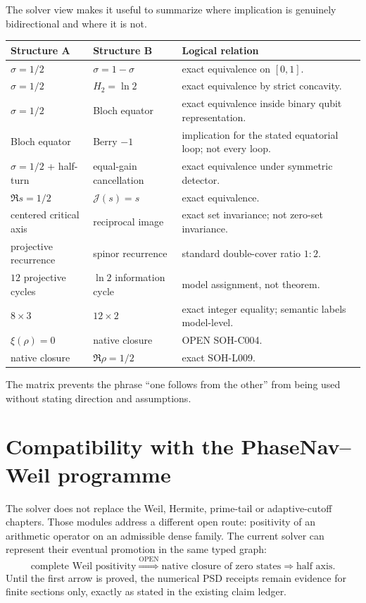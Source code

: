 The solver view makes it useful to summarize where implication is genuinely
bidirectional and where it is not.
\begin{longtable}{@{}p{}p{}p{}@{}}
\toprule
Structure A & Structure B & Logical relation\\
\midrule
$\sigma=1/2$ & $\sigma=1-\sigma$ & exact equivalence on $[0,1]$.\\
$\sigma=1/2$ & $H_2=\ln2$ & exact equivalence by strict concavity.\\
$\sigma=1/2$ & Bloch equator & exact equivalence inside binary qubit representation.\\
Bloch equator & Berry $-1$ & implication for the stated equatorial loop; not every loop.\\
$\sigma=1/2$ + half-turn & equal-gain cancellation & exact equivalence under symmetric detector.\\
$\Re s=1/2$ & $\mathcal J(s)=s$ & exact equivalence.\\
centered critical axis & reciprocal image & exact set invariance; not zero-set invariance.\\
projective recurrence & spinor recurrence & standard double-cover ratio $1:2$.\\
$12$ projective cycles & $\ln2$ information cycle & model assignment, not theorem.\\
$8\times3$ & $12\times2$ & exact integer equality; semantic labels model-level.\\
$\xi(\rho)=0$ & native closure & OPEN SOH-C004.\\
native closure & $\Re\rho=1/2$ & exact SOH-L009.\\
\bottomrule
\end{longtable}

The matrix prevents the phrase ``one follows from the other'' from being used
without stating direction and assumptions.

\section{Compatibility with the PhaseNav--Weil programme}

The solver does not replace the Weil, Hermite, prime-tail or adaptive-cutoff
chapters.  Those modules address a different open route: positivity of an
arithmetic operator on an admissible dense family.  The current solver can
represent their eventual promotion in the same typed graph:
\begin{equation}
 \text{complete Weil positivity}
 \stackrel{\mathrm{OPEN}}{\Longrightarrow}
 \text{native closure of zero states}
 \Longrightarrow
 \text{half axis}.
\end{equation}
Until the first arrow is proved, the numerical PSD receipts remain evidence for
finite sections only, exactly as stated in the existing claim ledger.

